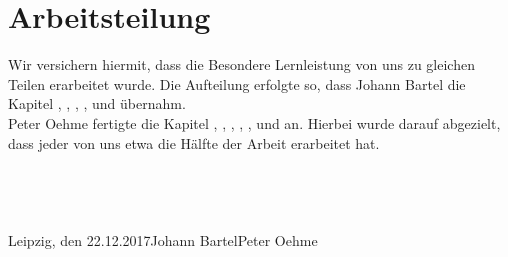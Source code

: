 \chapter{Arbeitsteilung}
Wir versichern hiermit, dass die Besondere Lernleistung von uns zu gleichen Teilen erarbeitet wurde.
Die Aufteilung erfolgte so, dass Johann Bartel die Kapitel , , , ,  und  übernahm. \\
Peter Oehme fertigte die Kapitel , , , , ,  und  an.
Hierbei wurde darauf abgezielt, dass jeder von uns etwa die Hälfte der Arbeit erarbeitet hat. \\\\\\\\\\
Leipzig, den 22.12.2017\tab Johann Bartel\tab \tab Peter Oehme